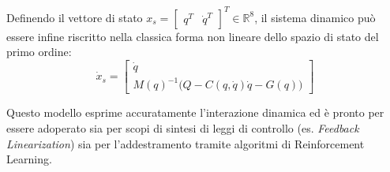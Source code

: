 \documentclass[11pt,a4paper]{article}
\begin{document}
	Definendo il vettore di stato $x_s = \begin{bmatrix} q^T & \dot{q}^T \end{bmatrix}^T \in \mathbb{R}^8$, il sistema dinamico può essere infine riscritto nella classica forma non lineare dello spazio di stato del primo ordine:
	\begin{equation}
		\dot{x}_s = \begin{bmatrix} \dot{q} \\ M(q)^{-1} \Big( Q - C(q, \dot{q})\dot{q} - G(q) \Big) \end{bmatrix}
	\end{equation}
	
	Questo modello esprime accuratamente l'interazione dinamica ed è pronto per essere adoperato sia per scopi di sintesi di leggi di controllo (es. \textit{Feedback Linearization}) sia per l'addestramento tramite algoritmi di Reinforcement Learning.
	
\end{document}

